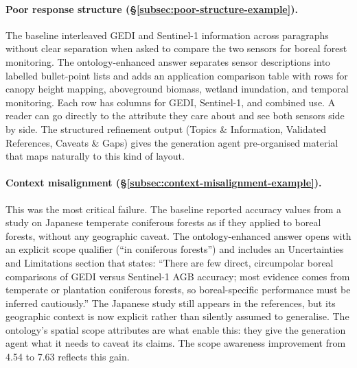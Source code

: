 \paragraph{Poor response structure (\S\ref{subsec:poor-structure-example}).} The baseline interleaved GEDI and Sentinel-1 information across paragraphs without clear separation when asked to compare the two sensors for boreal forest monitoring. The ontology-enhanced answer separates sensor descriptions into labelled bullet-point lists and adds an application comparison table with rows for canopy height mapping, aboveground biomass, wetland inundation, and temporal monitoring. Each row has columns for GEDI, Sentinel-1, and combined use. A reader can go directly to the attribute they care about and see both sensors side by side. The structured refinement output (Topics \& Information, Validated References, Caveats \& Gaps) gives the generation agent pre-organised material that maps naturally to this kind of layout.

\paragraph{Context misalignment (\S\ref{subsec:context-misalignment-example}).} This was the most critical failure. The baseline reported accuracy values from a study on Japanese temperate coniferous forests as if they applied to boreal forests, without any geographic caveat. The ontology-enhanced answer opens with an explicit scope qualifier (``in coniferous forests'') and includes an Uncertainties and Limitations section that states: ``There are few direct, circumpolar boreal comparisons of GEDI versus Sentinel-1 AGB accuracy; most evidence comes from temperate or plantation coniferous forests, so boreal-specific performance must be inferred cautiously.'' The Japanese study still appears in the references, but its geographic context is now explicit rather than silently assumed to generalise. The ontology's spatial scope attributes are what enable this: they give the generation agent what it needs to caveat its claims. The scope awareness improvement from 4.54 to 7.63 reflects this gain.
